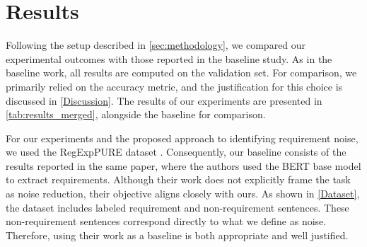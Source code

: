 \documentclass[sigconf,review]{acmart}
\begin{document}
\section{Results}
\label{Results}

Following the setup described in \autoref{sec:methodology}, we compared our experimental outcomes with those reported in the baseline study. As in the baseline work, all results are computed on the validation set. For comparison, we primarily relied on the accuracy metric, and the justification for this choice is discussed in \autoref{Discussion}. The results of our experiments are presented in \autoref{tab:results_merged}, alongside the baseline for comparison.

For our experiments and the proposed approach to identifying requirement noise, we used the RegExpPURE dataset \cite{ivanov2021regexppure}. Consequently, our baseline consists of the results reported in the same paper, where the authors used the BERT base model to extract requirements. Although their work does not explicitly frame the task as noise reduction, their objective aligns closely with ours. As shown in \autoref{Dataset}, the dataset includes labeled requirement and non-requirement sentences. These non-requirement sentences correspond directly to what we define as noise. Therefore, using their work as a baseline is both appropriate and well justified.
 

\end{document}
